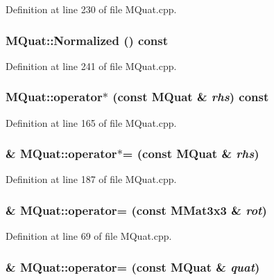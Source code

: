 Definition at line 230 of file MQuat.cpp.\hypertarget{class_m_quat_78397c335aeb118bf6f928c063f6431a}{
\subsubsection[{Normalized}]{ MQuat::Normalized () const}}
\label{class_m_quat_78397c335aeb118bf6f928c063f6431a}




Definition at line 241 of file MQuat.cpp.\hypertarget{class_m_quat_a3d68d57f2163eb7f626b2fffbe0bcb3}{
\subsubsection[{operator$\ast$}]{ MQuat::operator$\ast$ (const {\bf MQuat} \& {\em rhs}) const}}
\label{class_m_quat_a3d68d57f2163eb7f626b2fffbe0bcb3}




Definition at line 165 of file MQuat.cpp.\hypertarget{class_m_quat_42f61bacf7e7ed17c21a8008e6f32859}{
\subsubsection[{operator$\ast$=}]{ \& MQuat::operator$\ast$= (const {\bf MQuat} \& {\em rhs})}}
\label{class_m_quat_42f61bacf7e7ed17c21a8008e6f32859}




Definition at line 187 of file MQuat.cpp.\hypertarget{class_m_quat_6b16ae3c681ab3e7712bd1c3e9d8bb83}{
\subsubsection[{operator=}]{ \& MQuat::operator= (const {\bf MMat3x3} \& {\em rot})}}
\label{class_m_quat_6b16ae3c681ab3e7712bd1c3e9d8bb83}




Definition at line 69 of file MQuat.cpp.\hypertarget{class_m_quat_63cecf05b4c066e66091e952e0b2a6cc}{
\subsubsection[{operator=}]{ \& MQuat::operator= (const {\bf MQuat} \& {\em quat})}}
\label{class_m_quat_63cecf05b4c066e66091e952e0b2a6cc}




